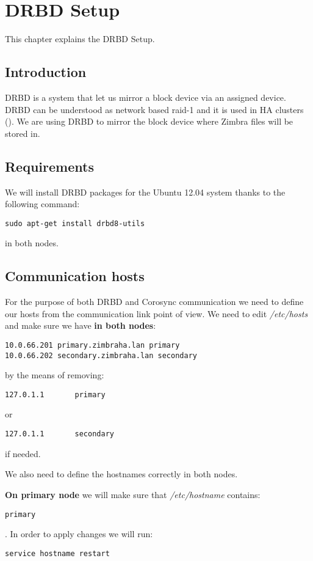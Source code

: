 

\chapter{DRBD Setup}
\label{chap:drbd-setup}
This chapter explains the DRBD Setup.

\section {Introduction}
DRBD is a system that let us mirror a block device via an assigned device. DRBD can be understood as network based raid-1 and it is used in HA clusters (\cite{LinbitDRBDWhatIs}).
We are using DRBD to mirror the block device where Zimbra files will be stored in.

\section {Requirements}
We will install DRBD packages for the Ubuntu 12.04 system thanks to the following command:
\begin{verbatim}
sudo apt-get install drbd8-utils
\end{verbatim}
in both nodes.
\section {Communication hosts}
For the purpose of both DRBD and Corosync communication we need to define our hosts from the communication link point of view. We need to edit \textit{/etc/hosts} and make sure we have \textbf{in both nodes}:

\begin{verbatim}
10.0.66.201 primary.zimbraha.lan primary
10.0.66.202 secondary.zimbraha.lan secondary
\end{verbatim}

by the means of removing:
\begin{verbatim}
127.0.1.1       primary
\end{verbatim}
or
\begin{verbatim}
127.0.1.1       secondary
\end{verbatim}
if needed.

We also need to define the hostnames correctly in both nodes.

\textbf{On primary node} we will make sure that \textit{/etc/hostname} contains:

\begin{verbatim}
primary
\end{verbatim}
. In order to apply changes we will run:
\begin{verbatim}
service hostname restart
\end{verbatim}

